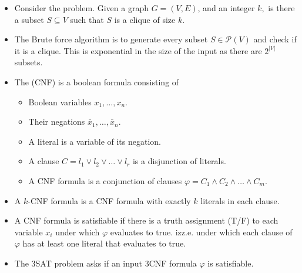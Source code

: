 \documentclass[a4paper,12pt]{article}
\begin{document}
\begin{itemize}
    \item Consider the  problem. Given a graph $G=(V,E)$, and an integer $k,$ is there a subset $S\subseteq V$ such that $S$ is a clique of size $k.$
    \item The Brute force algorithm is to generate every subset $S\in\mathcal P(V)$ and check if it is a clique. This is exponential in the size of the input as there are $2^{|V|}$ subsets.
\end{itemize}
\begin{itemize}
    \item The  (CNF) is a boolean formula consisting of \begin{itemize}
        \item Boolean variables $x_1,\dots,x_n$.
        \item Their negations $\bar x_1,\dots,\bar x_n$.
        \item A literal is a variable of its negation.
        \item A clause $C=l_1\lor l_2\lor\dots\lor l_r$ is a disjunction of literals.
        \item A CNF formula is a conjunction of clauses $\varphi = C_1\land C_2\land\dots\land C_m.$ 
    \end{itemize}
    \item A $k$-CNF formula is a CNF formula with exactly $k$ literals in each clause.
    \item A CNF formula is satisfiable if there is a truth assignment (T/F) to each variable $x_i$ under which $\varphi$ evaluates to true. izz.e. under which each clause of $\varphi$ has at least one literal that evaluates to true.
    \item The $3$SAT problem asks if an input $3$CNF formula $\varphi$ is satisfiable. 
\end{itemize}
\end{document}
